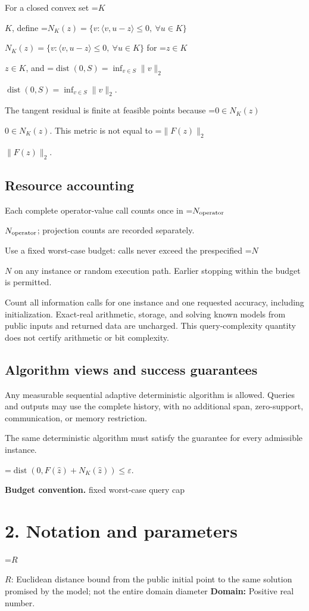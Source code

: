 \documentclass[10pt,a4paper]{article}
\newcommand{\AtlasMath}[1]{\par\begingroup\centering\setbox0=\hbox{$\displaystyle #1$}\ifdim\wd0>1.4\linewidth\typeout{ATLAS WIDE FORMULA: \the\wd0}\fi\ifdim\wd0>\linewidth\resizebox{\linewidth}{!}{\box0}\else\box0\fi\par\endgroup}
\newcommand{\AtlasInlineMath}[1]{\begingroup\setbox0=\hbox{$#1$}\ifdim\wd0>.4\linewidth\endgroup\AtlasMath{#1}\else\endgroup$#1$\fi}
\begin{document}
For a closed convex set \AtlasInlineMath{K}, define \AtlasInlineMath{N_K(z)=\{v:\langle v,u-z\rangle\le0,\ \forall u\in K\}} for \AtlasInlineMath{z\in K}, and \AtlasInlineMath{\operatorname{dist}(0,S)=\inf_{v\in S}\|v\|_2}.

The tangent residual is finite at feasible points because \AtlasInlineMath{0\in N_K(z)}. This metric is not equal to \AtlasInlineMath{\|F(z)\|_2}.

\subsection{Resource accounting}
Each complete operator-value call counts once in \AtlasInlineMath{N_{\rm operator}}; projection counts are recorded separately.

Use a fixed worst-case budget: calls never exceed the prespecified \AtlasInlineMath{N} on any instance or random execution path. Earlier stopping within the budget is permitted.

Count all information calls for one instance and one requested accuracy, including initialization. Exact-real arithmetic, storage, and solving known models from public inputs and returned data are uncharged. This query-complexity quantity does not certify arithmetic or bit complexity.

\subsection{Algorithm views and success guarantees}
Any measurable sequential adaptive deterministic algorithm is allowed. Queries and outputs may use the complete history, with no additional span, zero-support, communication, or memory restriction.

The same deterministic algorithm must satisfy the guarantee for every admissible instance.


\AtlasMath{\operatorname{dist}(0,F(\widehat{z})+N_K(\widehat{z}))\le\varepsilon.}


\textbf{Budget convention.} fixed worst-case query cap

\section{2. Notation and parameters}
\AtlasInlineMath{R}: Euclidean distance bound from the public initial point to the same solution promised by the model; not the entire domain diameter \textbf{Domain:} Positive real number.
\end{document}
